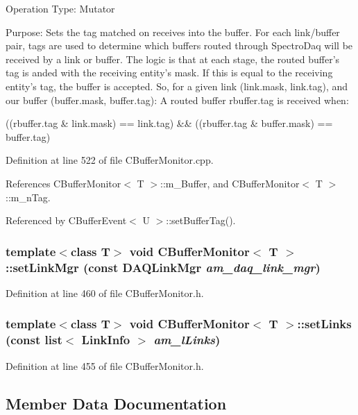 Operation Type: Mutator

Purpose: Sets the tag matched on receives into the buffer. For each link/buffer pair, tags are used to determine which buffers routed through Spectro\-Daq will be received by a link or buffer. The logic is that at each stage, the routed buffer's tag is anded with the receiving entity's mask. If this is equal to the receiving entity's tag, the buffer is accepted. So, for a given link (link.mask, link.tag), and our buffer (buffer.mask, buffer.tag): A routed buffer rbuffer.tag is received when:

((rbuffer.tag \& link.mask) == link.tag) \&\& ((rbuffer.tag \& buffer.mask) == buffer.tag) 

Definition at line 522 of file CBuffer\-Monitor.cpp.

References CBuffer\-Monitor$<$ T $>$::m\_\-Buffer, and CBuffer\-Monitor$<$ T $>$::m\_\-n\-Tag.

Referenced by CBuffer\-Event$<$ U $>$::set\-Buffer\-Tag().
\subsubsection{\setlength{\rightskip}{0pt plus 5cm}template$<$class T$>$ void CBuffer\-Monitor$<$ T $>$::set\-Link\-Mgr (const DAQLink\-Mgr {\em am\_\-daq\_\-link\_\-mgr})\hspace{0.3cm}{\tt  [inline, protected]}}\label{classCBufferMonitor_b2}




Definition at line 460 of file CBuffer\-Monitor.h.
\subsubsection{\setlength{\rightskip}{0pt plus 5cm}template$<$class T$>$ void CBuffer\-Monitor$<$ T $>$::set\-Links (const list$<$ {\bf Link\-Info} $>$ {\em am\_\-l\-Links})\hspace{0.3cm}{\tt  [inline, protected]}}\label{classCBufferMonitor_b1}




Definition at line 455 of file CBuffer\-Monitor.h.

\subsection{Member Data Documentation}
